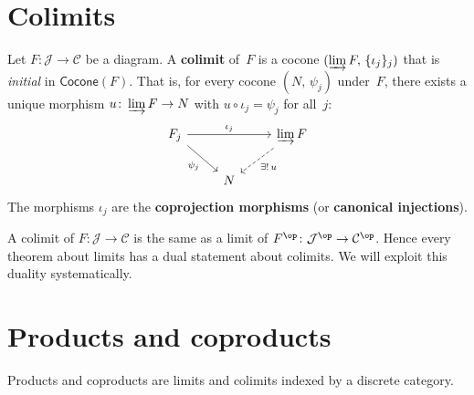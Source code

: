 \section{Colimits}\label{sec:colimits}

\begin{definition}[Colimit]\label{def:colimit}
Let $F\colon\mathcal{J}\to\mathcal{C}$ be a diagram.
A \textbf{colimit} of~$F$ is a cocone $(\varinjlim F,\,\{\iota_j\}_{j})$
that is \emph{initial} in $\mathsf{Cocone}(F)$.
That is, for every cocone $(N,\,\psi_j)$ under~$F$, there exists a
unique morphism $u\colon \varinjlim F\to N$
with $u\circ\iota_j = \psi_j$ for all~$j$:
\[
\begin{tikzcd}
F_j \arrow[rr, "\iota_j"] \arrow[dr, "\psi_j"'] & & \varinjlim F \arrow[dl, dashed, "\exists!\, u"] \\
& N &
\end{tikzcd}
\]
The morphisms $\iota_j$ are the \textbf{coprojection morphisms}
(or \textbf{canonical injections}).
\end{definition}

\begin{remark}\label{rem:colimit-dual}
A colimit of $F\colon\mathcal{J}\to\mathcal{C}$
is the same as a limit of $F^{\op}\colon\mathcal{J}^{\op}\to\mathcal{C}^{\op}$.
Hence every theorem about limits has a dual statement about colimits.
We will exploit this duality systematically.
\end{remark}


\section{Products and coproducts}\label{sec:products-coproducts}

Products and coproducts are limits and colimits indexed by a
discrete category.

